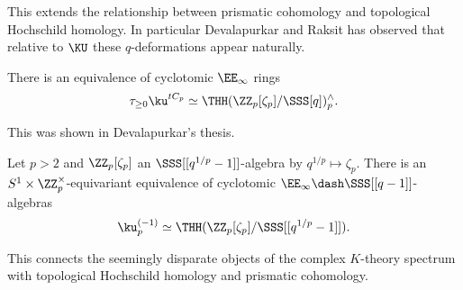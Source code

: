 This extends the relationship between prismatic cohomology and topological Hochschild homology. In particular Devalapurkar and Raksit has observed that relative to $\KU$ these $q$-deformations appear naturally. 
\begin{conjecture}
    There is an equivalence of cyclotomic $\EE_{\infty}$ rings 
    $$\tau_{\geq0}\ku^{tC_{p}}\simeq\THH(\ZZ_{p}[\zeta_{p}]/\SSS[q])^{\wedge}_{p}.$$
\end{conjecture}
This was shown in Devalapurkar's thesis.  
\begin{theorem}
    Let $p>2$ and $\ZZ_{p}[\zeta_{p}]$ an $\SSS[[q^{1/p}-1]]$-algebra by $q^{1/p}\mapsto\zeta_{p}$. There is an $S^{1}\times\ZZ_{p}^{\times}$-equivariant equivalence of cyclotomic $\EE_{\infty}\dash\SSS[[q-1]]$-algebras 
    $$\ku_{p}^{(-1)}\simeq\THH(\ZZ_{p}[\zeta_{p}]/\SSS[[q^{1/p}-1]]).$$
\end{theorem}
This connects the seemingly disparate objects of the complex $K$-theory spectrum with topological Hochschild homology and prismatic cohomology. 

